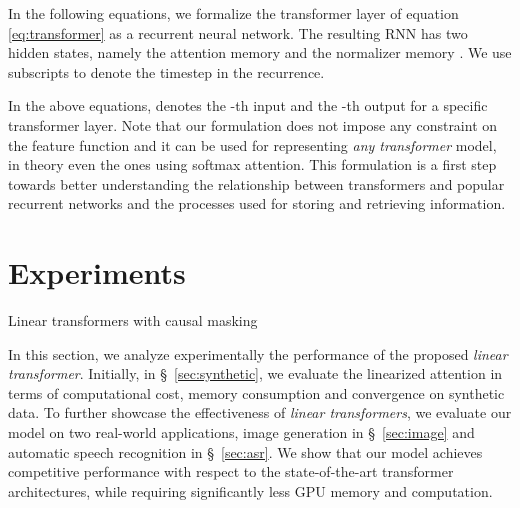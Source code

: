 \documentclass{article}
\newcommand{\linear}{\emph{linear transformer}}
\newcommand{\linears}{\emph{linear transformers}}
\begin{document}
In the following equations, we formalize the transformer layer of equation
\ref{eq:transformer} as a recurrent neural network. The resulting RNN
has two hidden states, namely the attention memory  and the
normalizer memory . We use subscripts to denote the timestep in the
recurrence.

In the above equations,  denotes the -th input and  the -th
output for a specific transformer layer. Note that our formulation does not
impose any constraint on the feature function and it can be used for
representing \emph{any transformer} model, in theory even the ones using softmax
attention. This formulation is a first step towards better understanding the
relationship between transformers and popular recurrent networks
\cite{hochreiter1997long} and the processes used for storing and retrieving
information.

\section{Experiments}

\begin{algorithm}[h]
    \caption{Linear transformers with causal masking} \label{alg:causal_product}
    \DontPrintSemicolon
    \;
\end{algorithm}

In this section, we analyze experimentally the performance of the proposed
\linear{}. Initially, in \S~\ref{sec:synthetic}, we evaluate the
linearized attention in terms of computational cost, memory consumption and
convergence on synthetic data. To further showcase the effectiveness of
\linears{}, we evaluate our model on two real-world applications,
image generation in \S~\ref{sec:image} and automatic speech recognition in
\S~\ref{sec:asr}. We show that our model achieves competitive performance with respect to the
state-of-the-art transformer architectures, while requiring significantly less
GPU memory and computation.
\end{document}
